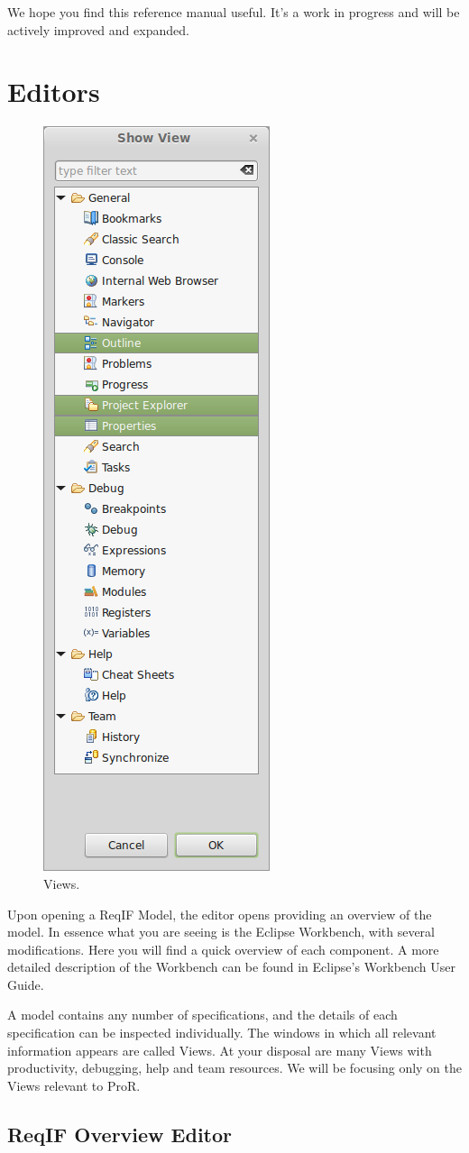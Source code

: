 We hope you find this reference manual useful.  It's a work in progress and will be actively improved and expanded.

\section{Editors}

\begin{figure}
\includegraphics[height=.9\textwidth]{../rmf-images/views_highlighted.png}
\caption[flushleft]{Views.}
\label{fig:Views}
\end{figure}


Upon opening a ReqIF Model, the editor opens providing an overview of the model.  In essence what you are seeing is the Eclipse Workbench, with several modifications.  Here you will find a quick overview of each component.  A more detailed description of the Workbench can be found in Eclipse's Workbench User Guide.

A model contains any number of specifications, and the details of each specification can be inspected individually.  The windows in which all relevant information appears are called Views.  At your disposal are many Views with productivity, debugging, help and team resources.  We will be focusing only on the Views relevant to ProR.
\clearpage
\newpage

\subsection{ReqIF Overview Editor}

